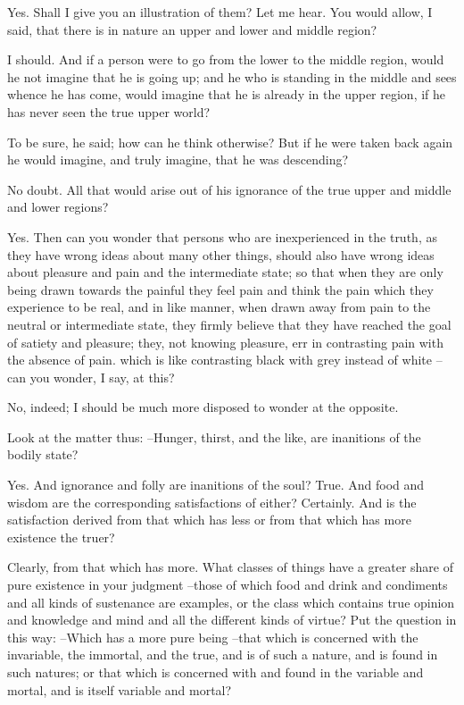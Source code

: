 Yes.
Shall I give you an illustration of them?
Let me hear.
You would allow, I said, that there is in nature an upper and lower and middle region?

I should.
And if a person were to go from the lower to the middle region, would he not imagine that he is going up; and he who is standing in the middle and sees whence he has come, would imagine that he is already in the upper region, if he has never seen the true upper world?

To be sure, he said; how can he think otherwise?
But if he were taken back again he would imagine, and truly imagine, that he was descending?

No doubt.
All that would arise out of his ignorance of the true upper and middle and lower regions?

Yes.
Then can you wonder that persons who are inexperienced in the truth, as they have wrong ideas about many other things, should also have wrong ideas about pleasure and pain and the intermediate state; so that when they are only being drawn towards the painful they feel pain and think the pain which they experience to be real, and in like manner, when drawn away from pain to the neutral or intermediate state, they firmly believe that they have reached the goal of satiety and pleasure; they, not knowing pleasure, err in contrasting pain with the absence of pain. which is like contrasting black with grey instead of white --can you wonder, I say, at this?

No, indeed; I should be much more disposed to wonder at the opposite.

Look at the matter thus: --Hunger, thirst, and the like, are inanitions of the bodily state?

Yes.
And ignorance and folly are inanitions of the soul?
True.
And food and wisdom are the corresponding satisfactions of either?
Certainly.
And is the satisfaction derived from that which has less or from that which has more existence the truer?

Clearly, from that which has more.
What classes of things have a greater share of pure existence in your judgment --those of which food and drink and condiments and all kinds of sustenance are examples, or the class which contains true opinion and knowledge and mind and all the different kinds of virtue? Put the question in this way: --Which has a more pure being --that which is concerned with the invariable, the immortal, and the true, and is of such a nature, and is found in such natures; or that which is concerned with and found in the variable and mortal, and is itself variable and mortal?

